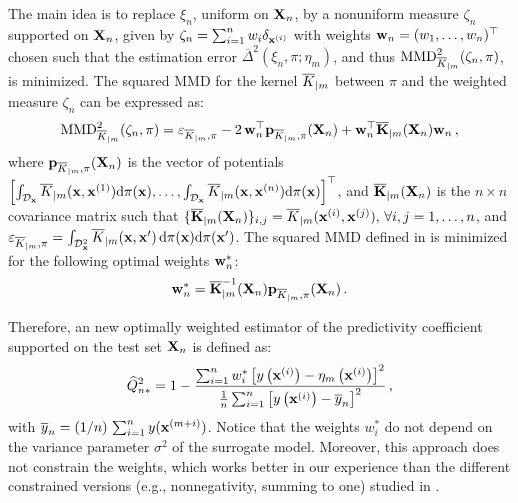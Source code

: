 The main idea is to replace $\xi_n$, uniform on ${\bf X}_n$, by a nonuniform measure $\zeta_n$ supported on ${\bf X}_n$, given by $\zeta_n = \sum_{i=1}^n w_i \delta_{{\bf x}^{(i)}}$ with weights $\mathbf{w}_n = (w_1,\ldots,w_n)^\top$ chosen such that the estimation error $\overline{\Delta}^2(\xi_n,\pi;\eta_m)$, and thus $\mathrm{MMD}_{\overline{K}_{|m}}^2(\zeta_n,\pi)$, is minimized. 
The squared MMD for the kernel $\overline{K}_{|m}$ between $\pi$ and the weighted measure $\zeta_n$ can be expressed as:  
\begin{equation}
    \mathrm{MMD}_{\overline{K}_{|m}}^2(\zeta_n,\pi) = \varepsilon_{\overline{K}_{|m}, \pi} - 2\,\mathbf{w}_n^\top \mathbf{p}_{\overline{K}_{|m}, \pi}({\bf X}_n) + \mathbf{w}_n^\top\overline{\mathbf{K}}_{|m}({\bf X}_n)\mathbf{w}_n \,,
    \label{eq:mmd2_validation}
\end{equation}
where $\mathbf{p}_{\overline{K}_{|m}, \pi}({\bf X}_n)$ is the vector of potentials $\left[\int_{\mathcal{D}_{\bf x}} \overline{K}_{|m}({\bf x}, {\bf x}^{(1)}) \mathrm{d} \pi({\bf x}), \dots, \int_{\mathcal{D}_{\bf x}} \overline{K}_{|m}({\bf x}, {\bf x}^{(n)}) \mathrm{d} \pi({\bf x})\right]^\top$, 
and $\overline{\mathbf{K}}_{|m}({\bf X}_n)$ is the $n \times n$ covariance matrix such that $\{\overline{\mathbf{K}}_{|m}({\bf X}_n)\}_{i,j}=\overline{K}_{|m}({\bf x}^{(i)},{\bf x}^{(j)}), \, \forall i,j=1,\ldots,n$, 
and $\varepsilon_{\overline{K}_{|m}, \pi}=\int_{\mathcal{D}_{\bf x}^2} \overline{K}_{|m}({\bf x},{\bf x}')\,\mathrm{d}\pi({\bf x})\mathrm{d}\pi({\bf x}')$.
%
The squared MMD defined in  is minimized for the following optimal weights $\mathbf{w}_n^*$: 
\begin{equation}
    \label{Eq:weights}
    \mathbf{w}_n^* = \overline{\mathbf{K}}_{|m}^{-1}({\bf X}_n)\mathbf{p}_{\overline{K}_{|m}, \pi}({\bf X}_n) \,.
\end{equation}

Therefore, an new optimally weighted estimator of the predictivity coefficient supported on the test set ${\bf X}_n$ is defined as: 
\begin{equation}
    \widehat Q_{n*}^2 = 1 - \frac{\sum_{i=1}^n w_i^* \left[ y\left({\bf x}^{(i)}\right)-\eta_m\left({\bf x}^{(i)}\right)\right]^2}{\frac1n \sum_{i=1}^n \left[y\left({\bf x}^{(i)}\right)-\overline{y}_n\right]^2} \,,
    \label{Q2-est*}
\end{equation}
with $\overline{y}_n=(1/n)\,\sum_{i=1}^n y({\bf x}^{(m+i)})$.
Notice that the weights $w_i^*$ do not depend on the variance parameter $\sigma^2$ of the surrogate model. 
Moreover, this approach does not constrain the weights, which works better in our experience than the different constrained versions (e.g., nonnegativity, summing to one) studied in \citet{pronzato_rendas_2021}. 

